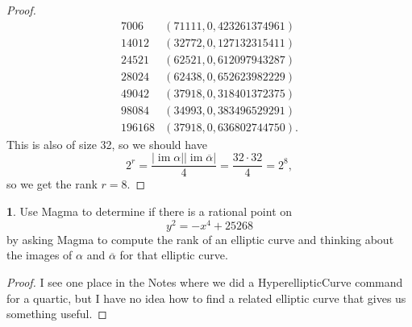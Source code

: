 \documentclass[12pt]{article}
\DeclareMathOperator{\im}{im}
\theoremstyle{definition}
\newtheorem{ex}{}
\begin{document}
\begin{proof}
\begin{equation*}
\begin{array}{r|c}
			7006             & (71111, 0, 423261374961)  \\
			14012            & (32772, 0, 127132315411)  \\
			24521            & (62521, 0, 612097943287)  \\
			28024            & (62438, 0, 652623982229)  \\
			49042            & (37918, 0, 318401372375)  \\
			98084            & (34993, 0, 383496529291)  \\
			196168           & (37918, 0, 636802744750).
		\end{array}
	\end{equation*}
	This is also of size 32, so we should have \begin{equation*}
		2^r = \frac{|\im\alpha||\im\overline{\alpha}|}{4} = \frac{32\cdot 32}{4} = 2^8,
	\end{equation*}
	so we get the rank $r = 8$.
\end{proof}

\begin{ex}
	Use Magma to determine if there is a rational point on
	\[
		y^{2} = -x^{4} + 25268
	\]
	by asking Magma to compute the rank of an elliptic curve and thinking
	about the images of $\alpha$ and $\overline{\alpha}$ for that elliptic curve.
\end{ex}
\begin{proof}
  I see one place in the Notes where we did a HyperellipticCurve command for a quartic, but I have no idea how to find a related elliptic curve that gives us something useful.
\end{proof}
\end{document}
